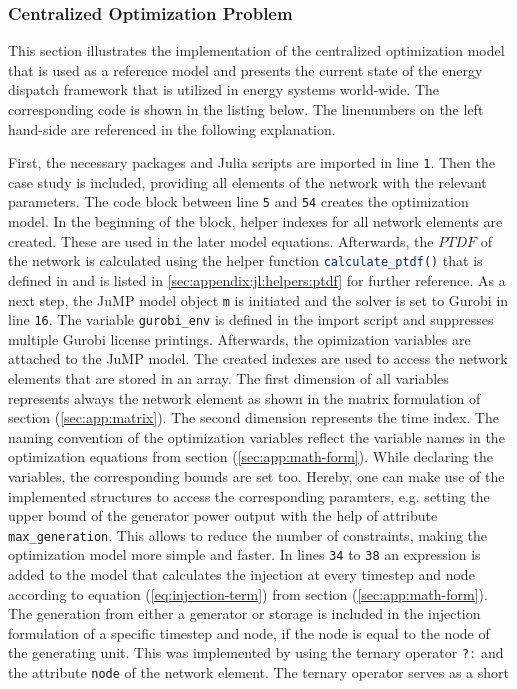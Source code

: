 \subsubsection{Centralized Optimization Problem}

This section illustrates the implementation of the centralized optimization model that is used as a reference model and presents the current state of the energy dispatch framework that is utilized in energy systems world-wide. The corresponding code is shown in the listing below. The linenumbers on the left hand-side are referenced in the following explanation.



First, the necessary packages and Julia scripts are imported in line \texttt{1}. Then the case study is included, providing all elements of the network with the relevant parameters. The code block between line \texttt{5} and \texttt{54} creates the optimization model. In the beginning of the block, helper indexes for all network elements are created. These are used in the later model equations. Afterwards, the $PTDF$ of the network is calculated using the helper function \lstinline[language=julia]{calculate_ptdf()} that is defined in  and is listed in \ref{sec:appendix:jl:helpers:ptdf} for further reference.  As a next step, the JuMP model object \lstinline[language=julia]{m} is initiated and the solver is set to Gurobi in line \texttt{16}. The variable \lstinline[language=julia]{gurobi_env} is defined in the import script  and suppresses multiple Gurobi license printings. Afterwards, the opimization variables are attached to the JuMP model. The created indexes are used to access the network elements that are stored in an array. The first dimension of all variables represents always the network element as shown in the matrix formulation of section (\ref{sec:app:matrix}). The second dimension represents the time index. The naming convention of the optimization variables reflect the variable names in the optimization equations from section (\ref{sec:app:math-form}). While declaring the variables, the corresponding bounds are set too. Hereby, one can make use of the implemented structures to access the corresponding paramters, e.g. setting the upper bound of the generator power output with the help of attribute \lstinline[language=julia]{max_generation}. This allows to reduce the number of constraints, making the optimization model more simple and faster. In lines \texttt{34} to \texttt{38} an expression is added to the model that calculates the injection at every timestep and node according to equation (\ref{eq:injection-term}) from section (\ref{sec:app:math-form}). The generation from either a generator or storage is included in the injection formulation of a specific timestep and node, if the node is equal to the node of the generating unit. This was implemented by using the ternary operator \lstinline[language=julia]{?:} and the attribute \lstinline[language=julia]{node} of the network element. The ternary operator serves as a short 
